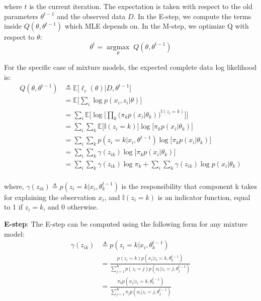 where $t$ is the current iteration. The expectation is taken with respect to the old parameters $\theta^{t-1}$ and the observed data $D$. In the E-step, we compute the terms inside $Q(\theta, \theta^{t-1})$ which MLE depends on. In the M-step, we optimize Q with respect to $\theta$:
\begin{equation} \label{log-lik-observed-f}
	\theta^{t} = \underset{\theta}{\operatorname{argmax}} \; Q(\theta, \theta^{t-1})
\end{equation}

For the specific case of mixture models, the expected complete data log likelihood is:
\begin{equation} \label{log-lik-expected-f}
	\begin{split}
		Q(\theta, \theta^{t-1}) & \triangleq \mathbb{E} \big[\ell_{c}(\theta) | D, \theta^{t-1}\big] \\
								& = \mathbb{E} \bigg[ \sum_{i} \log p(x_{i}, z_{i}|\theta) \bigg] \\
								& = \sum_{i} \mathbb{E} \bigg[ \log \bigg[\prod_{k} \big( \pi_{k}p(x_{i}|\theta_{k})\big)^{\mathbb{I}(z_{i}=k)} \bigg]\bigg] \\
								& = \sum_{i} \sum_{k} \mathbb{E} \big[\mathbb{I}(z_{i}=k)\big] \log \big[\pi_{k}p(x_{i}|\theta_{k})\big] \\
								& = \sum_{i} \sum_{k} p(z_{i}=k|x_{i},\theta^{t-1}) \log \big[\pi_{k}p(x_{i}|\theta_{k})\big] \\
								& = \sum_{i} \sum_{k} \gamma(z_{ik}) \log \big[\pi_{k}p(x_{i}|\theta_{k})\big] \\
								& = \sum_{i} \sum_{k} \gamma(z_{ik}) \log \pi_{k} + \sum_{i} \sum_{k} \gamma(z_{ik}) \log p(x_{i}|\theta_{k}) \\		
	\end{split}
\end{equation}

where, $\gamma(z_{ik}) \triangleq p(z_{i}=k|x_{i},\theta_{k}^{t-1})$ is the responsibility that component k takes for explaining the observation $x_{i}$, and $\mathbb{I}(z_{i}=k)$ is an indicator function, equal to 1 if $z_{i}=k$, and 0 otherwise.

\noindent
\textbf{E-step}: The E-step can be computed using the following form for any mixture model:
\begin{equation} \label{responsibilities-f}
  \begin{split}
	\gamma(z_{ik}) & \triangleq p(z_{i}=k|x_{i},\theta_{k}^{t-1}) \\
				   & = \frac{p(z_{i}=k)p(x_{i}|z_{i}=k,\theta_{k}^{t-1})}{\sum\limits_{j=1}^{K} p(z_{i}=j)p(x_{i}|z_{i}=j,\theta_{j}^{t-1})} \\
				   & = \frac{\pi_{k}p(x_{i}|z_{i}=k,\theta_{k}^{t-1})}{\sum\limits_{j=1}^{K} \pi_{j}p(x_{i}|z_{i}=j,\theta_{j}^{t-1})}
  \end{split}
\end{equation}


